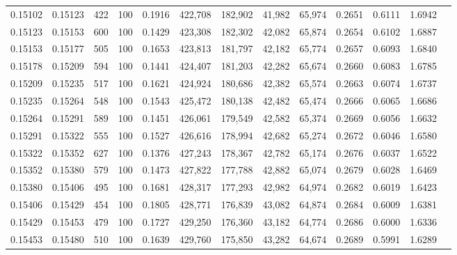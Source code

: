 \begin{tabular}{rrrrrrrrrrrrr}
0.15102 & 0.15123 &   422 & 100 &                                     0.1916 & 422,708 & 182,902 &  41,982 &  65,974 & 0.2651 & 0.6111 & 1.6942 \\
0.15123 & 0.15153 &   600 & 100 &                                     0.1429 & 423,308 & 182,302 &  42,082 &  65,874 & 0.2654 & 0.6102 & 1.6887 \\
0.15153 & 0.15177 &   505 & 100 &                                     0.1653 & 423,813 & 181,797 &  42,182 &  65,774 & 0.2657 & 0.6093 & 1.6840 \\
0.15178 & 0.15209 &   594 & 100 &                                     0.1441 & 424,407 & 181,203 &  42,282 &  65,674 & 0.2660 & 0.6083 & 1.6785 \\
0.15209 & 0.15235 &   517 & 100 &                                     0.1621 & 424,924 & 180,686 &  42,382 &  65,574 & 0.2663 & 0.6074 & 1.6737 \\
0.15235 & 0.15264 &   548 & 100 &                                     0.1543 & 425,472 & 180,138 &  42,482 &  65,474 & 0.2666 & 0.6065 & 1.6686 \\
0.15264 & 0.15291 &   589 & 100 &                                     0.1451 & 426,061 & 179,549 &  42,582 &  65,374 & 0.2669 & 0.6056 & 1.6632 \\
0.15291 & 0.15322 &   555 & 100 &                                     0.1527 & 426,616 & 178,994 &  42,682 &  65,274 & 0.2672 & 0.6046 & 1.6580 \\
0.15322 & 0.15352 &   627 & 100 &                                     0.1376 & 427,243 & 178,367 &  42,782 &  65,174 & 0.2676 & 0.6037 & 1.6522 \\
0.15352 & 0.15380 &   579 & 100 &                                     0.1473 & 427,822 & 177,788 &  42,882 &  65,074 & 0.2679 & 0.6028 & 1.6469 \\
0.15380 & 0.15406 &   495 & 100 &                                     0.1681 & 428,317 & 177,293 &  42,982 &  64,974 & 0.2682 & 0.6019 & 1.6423 \\
0.15406 & 0.15429 &   454 & 100 &                                     0.1805 & 428,771 & 176,839 &  43,082 &  64,874 & 0.2684 & 0.6009 & 1.6381 \\
0.15429 & 0.15453 &   479 & 100 &                                     0.1727 & 429,250 & 176,360 &  43,182 &  64,774 & 0.2686 & 0.6000 & 1.6336 \\
0.15453 & 0.15480 &   510 & 100 &                                     0.1639 & 429,760 & 175,850 &  43,282 &  64,674 & 0.2689 & 0.5991 & 1.6289 \\

\end{tabular}
